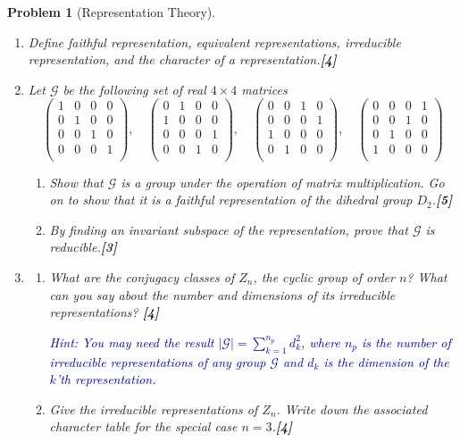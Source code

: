 \documentclass[a4paper]{article}
\theoremstyle{new}
\newtheorem{qns}{Problem}[section]
\begin{document}
\begin{qns}[Representation Theory]\leavevmode
\begin{enumerate}[label=(\roman*)]
\item Define faithful representation, equivalent representations, irreducible representation, and the character of a representation.\hfill\textbf{[4]}
\item Let $\mathcal{G}$ be the following set of real $4\times 4$ matrices
$$\begin{pmatrix}1&0&0&0\\0&1&0&0\\0&0&1&0\\0&0&0&1\\\end{pmatrix},\quad\begin{pmatrix}0&1&0&0\\1&0&0&0\\0&0&0&1\\0&0&1&0\\\end{pmatrix},\quad\begin{pmatrix}0&0&1&0\\0&0&0&1\\1&0&0&0\\0&1&0&0\\\end{pmatrix},\quad\begin{pmatrix}0&0&0&1\\0&0&1&0\\0&1&0&0\\1&0&0&0\\\end{pmatrix}$$
\begin{enumerate}[label=(\alph*)]
\item Show that $\mathcal{G}$ is a group under the operation of matrix multiplication. Go on to show that it is a faithful representation of the dihedral group $D_2$.\hfill\textbf{[5]}\item By finding an invariant subspace of the representation, prove that $\mathcal{G}$ is reducible.\hfill\textbf{[3]}
\end{enumerate}
\item 
\begin{enumerate}[label=(\alph*)]
\item What are the conjugacy classes of $Z_n$, the cyclic group of order $n$? What can you say about the number and dimensions of its irreducible representations? \hfill\textbf{[4]}
\begin{mdframed}
\textcolor{darkblue}{Hint: You may need the result $|\mathcal{G}|=\sum_{k=1}^{n_p}d_k^2$, where $n_p$ is the number of irreducible representations of any group $\mathcal{G}$ and $d_k$ is the dimension of the $k$’th representation.}
\end{mdframed}
\item Give the irreducible representations of $Z_n$. Write down the associated character table for the special case $n = 3$.\hfill\textbf{[4]}
\end{enumerate}
\end{enumerate}
\end{qns}
\end{document}
